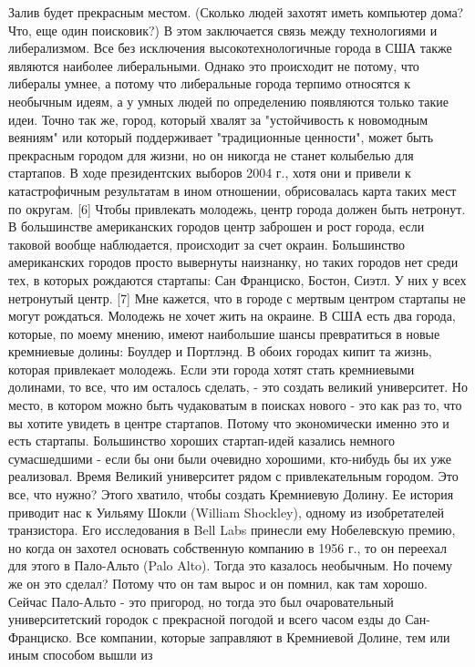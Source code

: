 \documentclass[ebook,12pt,oneside,openany]{memoir}
\begin{document}
Залив будет прекрасным местом. (Сколько людей захотят иметь компьютер
дома? Что, еще один поисковик?) В этом заключается связь между
технологиями и либерализмом. Все без исключения высокотехнологичные
города в США также являются наиболее либеральными. Однако это
происходит не потому, что либералы умнее, а потому что либеральные
города терпимо относятся к необычным идеям, а у умных людей по
определению появляются только такие идеи. Точно так же, город, который
хвалят за "устойчивость к новомодным веяниям" или который поддерживает
"традиционные ценности", может быть прекрасным городом для жизни, но
он никогда не станет колыбелью для стартапов. В ходе президентских
выборов 2004 г., хотя они и привели к катастрофичным результатам в
ином отношении, обрисовалась карта таких мест по округам. [6] Чтобы
привлекать молодежь, центр города должен быть нетронут. В большинстве
американских городов центр заброшен и рост города, если таковой вообще
наблюдается, происходит за счет окраин. Большинство американских
городов просто вывернуты наизнанку, но таких городов нет среди тех, в
которых рождаются стартапы: Сан Франциско, Бостон, Сиэтл. У них у всех
нетронутый центр. [7] Мне кажется, что в городе с мертвым центром
стартапы не могут рождаться. Молодежь не хочет жить на окраине. В США
есть два города, которые, по моему мнению, имеют наибольшие шансы
превратиться в новые кремниевые долины: Боулдер и Портлэнд. В обоих
городах кипит та жизнь, которая привлекает молодежь. Если эти города
хотят стать кремниевыми долинами, то все, что им осталось сделать, -
это создать великий университет. Но место, в котором можно быть
чудаковатым в поисках нового - это как раз то, что вы хотите увидеть в
центре стартапов. Потому что экономически именно это и есть стартапы.
Большинство хороших стартап-идей казались немного сумасшедшими - если
бы они были очевидно хорошими, кто-нибудь бы их уже реализовал. Время
Великий университет рядом с привлекательным городом. Это все, что
нужно? Этого хватило, чтобы создать Кремниевую Долину. Ее история
приводит нас к Уильяму Шокли (William Shockley), одному из
изобретателей транзистора. Его исследования в Bell Labs принесли ему
Нобелевскую премию, но когда он захотел основать собственную компанию
в 1956 г., то он переехал для этого в Пало-Альто (Palo Alto). Тогда
это казалось необычным. Но почему же он это сделал? Потому что он там
вырос и он помнил, как там хорошо. Сейчас Пало-Альто - это пригород,
но тогда это был очаровательный университетский городок с прекрасной
погодой и всего часом езды до Сан-Франциско. Все компании, которые
заправляют в Кремниевой Долине, тем или иным способом вышли из
\end{document}
